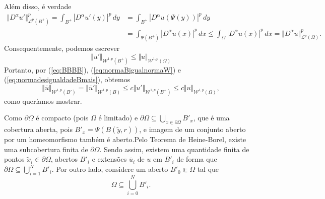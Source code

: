 \documentclass[a4paper, 11pt]{book}
\theoremstyle{definition}
\newcommand{\cL}{\mathcal{L}}
\newcommand{\cW}{\mathcal{W}}
\begin{document}
\begin{prf}
\begin{equation}
    \end{equation}
    Além disso, é verdade
    \[
        \begin{aligned}
            \Vert D^\alpha u' \Vert_{\cL^p(B^+)}^p = \int_{B^+} |D^\alpha u'(y) |^p \,dy &= \int_{B^+} |D^\alpha u (\Psi(y))|^p \,dy\\ &= \int_{\Psi(B^+)} |D^\alpha u(x)|^p \,dx \leqslant \int_{\Omega} |D^\alpha u(x)|^p \,dx = \Vert D^\alpha u \Vert_{\cL^p(\Omega)}^p.
        \end{aligned}
    \]
    Consequentemente, podemos escrever
    \begin{equation} \label{eq:normadesigualdadeBmais}
        \Vert u' \Vert_{\cW^{1,p}(B^+)} \leqslant \Vert u \Vert_{\cW^{1,p}(\Omega)}
    \end{equation}
    Portanto, por (\ref{eq:BBBB}), (\ref{eq:normaBigualnormaW}) e (\ref{eq:normadesigualdadeBmais}), obtemos
    \begin{equation} \label{eq:desigualdadeWO}
        \Vert \bar u \Vert_{\cW^{1,p}(B')} = \Vert \bar u' \Vert_{\cW^{1,p}(B)} \leqslant c \Vert u' \Vert_{\cW^{1,p}(B^+)} \leqslant c \Vert u \Vert_{\cW^{1,p}(\Omega)},
    \end{equation}
    como queríamos mostrar.

    Como $\partial\Omega$ é compacto (pois $\Omega$ é limitado) e $\partial \Omega \subseteq \bigcup_{x \in \partial\Omega} B'_x$,
    que é uma cobertura aberta, pois $B'_x = \Psi(B(\tilde y, r))$, e imagem de um conjunto aberto por um homeomorfismo também é aberto.Pelo Teorema de Heine-Borel, existe uma subcobertura finita de $\partial\Omega$.
    Sendo assim, existem uma quantidade finita de pontos $\tilde x_i \in \partial\Omega$, abertos $B'_i$ e extensões $\bar u_i$ de $u$ em $B'_i$ de forma que $\partial\Omega \subseteq \bigcup_{i=1}^N B'_i$.
    Por outro lado, considere um aberto $B'_0 \Subset \Omega$ tal que
    \[
        \Omega \subseteq \bigcup_{i=0}^N B'_i.
    \]


\end{prf}
\end{document}

